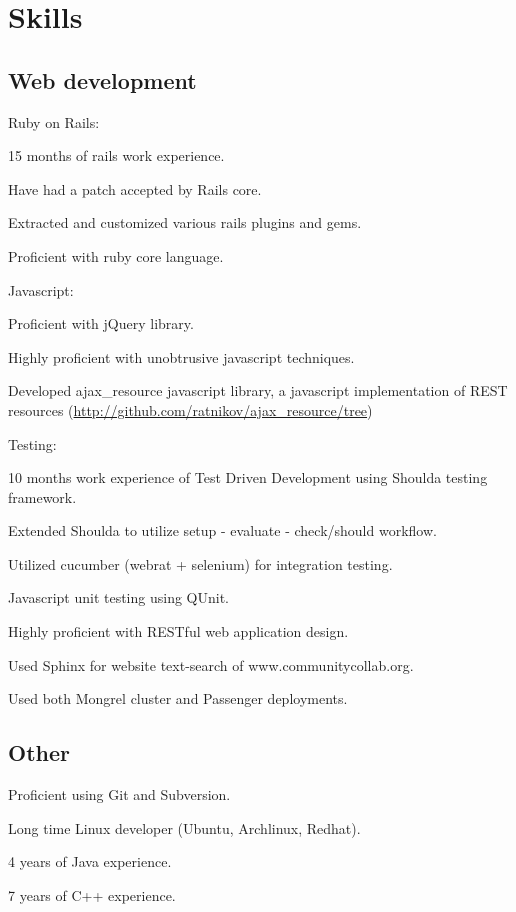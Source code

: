 \documentclass{resume}
\begin{document}
\section{Skills}

\subsection{Web development}

\begin{compactitem}
  \item Ruby on Rails:
    \begin{compactitem}
      \item 15 months of rails work experience.
      \item Have had a patch accepted by Rails core.
      \item Extracted and customized various rails plugins and gems.
      \item Proficient with ruby core language.
    \end{compactitem}

  \item Javascript:
    \begin{compactitem}
      \item Proficient with jQuery library.
      \item Highly proficient with unobtrusive javascript techniques.
      \item Developed ajax\_resource javascript library, a javascript implementation of REST resources (\url{http://github.com/ratnikov/ajax_resource/tree})
    \end{compactitem}

  \item Testing:
    \begin{compactitem}
      \item 10 months work experience of Test Driven Development using Shoulda testing framework.
      \item Extended Shoulda to utilize setup - evaluate - check/should workflow.
      \item Utilized cucumber (webrat + selenium) for integration testing.
      \item Javascript unit testing using QUnit.
    \end{compactitem}

  \item Highly proficient with RESTful web application design.
  \item Used Sphinx for website text-search of www.communitycollab.org.
  \item Used both Mongrel cluster and Passenger deployments.
\end{compactitem}

\subsection{Other}
\begin{compactitem}
  \item Proficient using Git and Subversion.
  \item Long time Linux developer (Ubuntu, Archlinux, Redhat).
  \item 4 years of Java experience.
  \item 7 years of C++ experience.
\end{compactitem}
\end{document}
